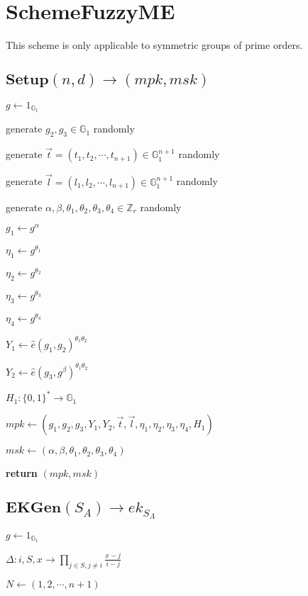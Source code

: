 \documentclass[a4paper]{article}
\begin{document}
\section{SchemeFuzzyME}

This scheme is only applicable to symmetric groups of prime orders. 

\subsection{$\textbf{Setup}(n, d) \rightarrow (\textit{mpk}, \textit{msk})$}

$g \gets 1_{\mathbb{G}_1}$

generate $g_2, g_3 \in \mathbb{G}_1$ randomly

generate $\vec{t} = (t_1, t_2, \cdots, t_{n + 1}) \in \mathbb{G}_1^{n + 1}$ randomly

generate $\vec{l} = (l_1, l_2, \cdots, l_{n + 1}) \in \mathbb{G}_1^{n + 1}$ randomly

generate $\alpha, \beta, \theta_1, \theta_2, \theta_3, \theta_4 \in \mathbb{Z}_r$ randomly

$g_1 \gets g^\alpha$

$\eta_1 \gets g^{\theta_1}$

$\eta_2 \gets g^{\theta_2}$

$\eta_3 \gets g^{\theta_3}$

$\eta_4 \gets g^{\theta_4}$

$Y_1 \gets \hat{e}(g_1, g_2)^{\theta_1 \theta_2}$

$Y_2 \gets \hat{e}(g_3, g^\beta)^{\theta_1 \theta_2}$

$H_1: \{0, 1\}^* \rightarrow \mathbb{G}_1$

$ \textit{mpk} \gets (g_1, g_2, g_3, Y_1, Y_2, \vec{t}, \vec{l}, \eta_1, \eta_2, \eta_3, \eta_4, H_1)$

$\textit{msk} \gets (\alpha, \beta, \theta_1, \theta_2, \theta_3, \theta_4)$

\textbf{return} $(\textit{mpk}, \textit{msk})$

\subsection{$\textbf{EKGen}(S_A) \rightarrow \textit{ek}_{S_A}$}

$g \gets 1_{\mathbb{G}_1}$

$\Delta: i, S, x \rightarrow \prod\limits_{j \in S, j \neq i} \frac{x - j}{i - j}$

$N \gets (1, 2, \cdots, n + 1)$
\end{document}
